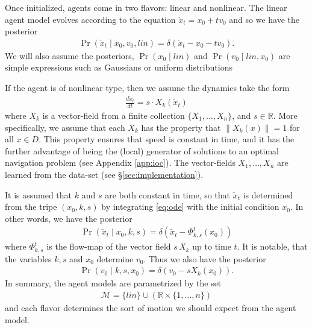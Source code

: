 \documentclass[conference]{IEEEtran}
\begin{document}
Once initialized, agents come in two flavors: linear and nonlinear.
The linear agent model evolves according to the equation $\check{x}_t = x_0 + t v_0$ and so we have the posterior
\begin{align*}
	\Pr( \check{x}_t \mid x_0, v_0, lin) = \delta( \check{x}_t - x_0 - t v_0 ).
\end{align*}
We will also assume the posteriors, $\Pr(x_0 \mid lin)$ and $\Pr( v_0 \mid lin, x_0)$ are simple expressions such as Gaussians or uniform distributions

If the agent is of nonlinear type, then we assume the dynamics take the form
\begin{align}
	\frac{d \check{x}_t}{dt} = s \cdot X_k(\check{x}_t) \label{eq:ode}
\end{align}
where $X_k$ is a vector-field from a finite collection $\{X_1, \dots, X_n\}$, and $s \in \mathbb{R}$.
More specifically, we assume that each $X_k$ has the property that $\| X_k(x) \| = 1$ for all $x \in D$.
This property ensures that speed is constant in time, and it has the further advantage of being the (local) generator
of solutions to an optimal navigation problem (see Appendix \ref{app:ioc}).
The vector-fields $X_1,\dots,X_n$ are learned from the data-set (see \S \ref{sec:implementation}).

It is assumed that $k$ and $s$ are both constant in time, so that $\check{x}_t$ is determined from the
tripe $(x_0,k,s)$ by integrating \eqref{eq:ode} with the initial condition $x_0$.
In other words, we have the posterior
\begin{align}
	\Pr( \check{x}_t \mid x_0 , k , s) = \delta( \check{x}_t - \Phi^{t}_{k,s}( x_0) ) \label{eq:x_check | ksx}
\end{align}
where $\Phi^{t}_{k,s}$ is the flow-map of the vector field $s \,X_k$ up to time $t$.
It is notable, that the variables $k,s$ and $x_0$ determine $v_0$.
Thus we also have the posterior
\begin{align}
	\Pr( v_0 \mid k, s, x_0) = \delta( v_0 -s X_k( x_0) ). \label{eq:v | ksx}
\end{align}
In summary, the agent models are parametrized by the set
\begin{align}
	\mathcal{M} = \{ lin \} \cup \left( \mathbb{R} \times \{ 1 , \dots, n \} \right) \label{eq:models}
\end{align}
and each flavor determines the sort of motion we should expect from the agent model.
\end{document}
